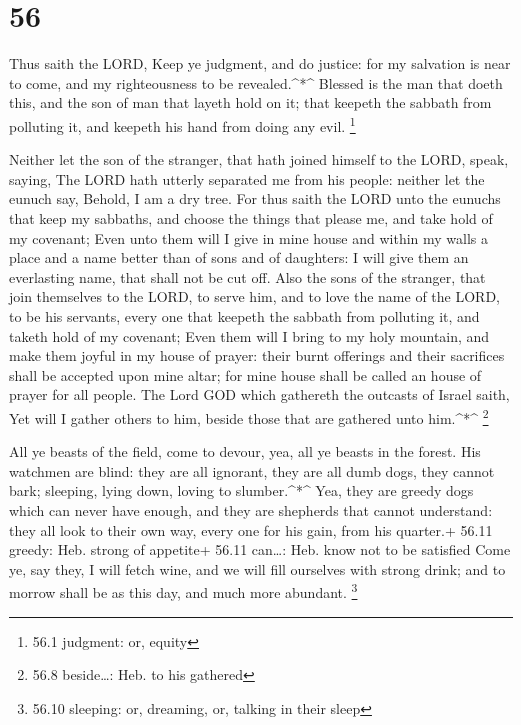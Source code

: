 \hypertarget{section-55}{%
\section{56}\label{section-55}}

 Thus saith the LORD, Keep ye judgment, and do justice: for
my salvation is near to come, and my righteousness to be
revealed.\^{}*\^{}  Blessed is the man that doeth this, and
the son of man that layeth hold on it; that keepeth the sabbath from
polluting it, and keepeth his hand from doing any evil. \footnote{56.1
  judgment: or, equity}

 Neither let the son of the stranger, that hath joined
himself to the LORD, speak, saying, The LORD hath utterly separated me
from his people: neither let the eunuch say, Behold, I am a dry tree.
 For thus saith the LORD unto the eunuchs that keep my
sabbaths, and choose the things that please me, and take hold of my
covenant;  Even unto them will I give in mine house and
within my walls a place and a name better than of sons and of daughters:
I will give them an everlasting name, that shall not be cut off.
 Also the sons of the stranger, that join themselves to the
LORD, to serve him, and to love the name of the LORD, to be his
servants, every one that keepeth the sabbath from polluting it, and
taketh hold of my covenant;  Even them will I bring to my
holy mountain, and make them joyful in my house of prayer: their burnt
offerings and their sacrifices shall be accepted upon mine altar; for
mine house shall be called an house of prayer for all people.
 The Lord GOD which gathereth the outcasts of Israel saith,
Yet will I gather others to him, beside those that are gathered unto
him.\^{}*\^{} \footnote{56.8 beside\ldots: Heb. to his gathered}

 All ye beasts of the field, come to devour, yea, all ye
beasts in the forest.  His watchmen are blind: they are all
ignorant, they are all dumb dogs, they cannot bark; sleeping, lying
down, loving to slumber.\^{}*\^{}  Yea, they are greedy
dogs which can never have enough, and they are shepherds that cannot
understand: they all look to their own way, every one for his gain, from
his quarter.+ 56.11 greedy: Heb. strong of appetite+ 56.11 can\ldots:
Heb. know not to be satisfied  Come ye, say they, I will
fetch wine, and we will fill ourselves with strong drink; and to morrow
shall be as this day, and much more abundant. \footnote{56.10 sleeping:
  or, dreaming, or, talking in their sleep}

